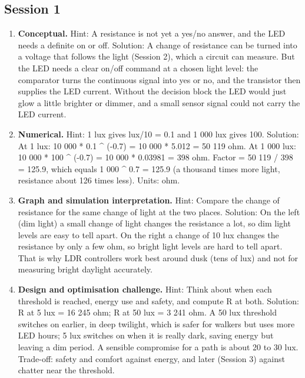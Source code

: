 \documentclass[11pt,a4paper]{article}
\begin{document}
\subsection*{Session 1}
\begin{enumerate}[nosep]
\item \textbf{Conceptual.} Hint: A resistance is not yet a yes/no answer, and the LED needs a definite on or off. Solution: A change of resistance can be turned into a voltage that follows the light (Session 2), which a circuit can measure. But the LED needs a clear on/off command at a chosen light level: the comparator turns the continuous signal into yes or no, and the transistor then supplies the LED current. Without the decision block the LED would just glow a little brighter or dimmer, and a small sensor signal could not carry the LED current.
\item \textbf{Numerical.} Hint: 1 lux gives lux/10 = 0.1 and 1 000 lux gives 100. Solution: At 1 lux: 10 000 * 0.1 \textasciicircum{} (-0.7) = 10 000 * 5.012 = 50 119 ohm. At 1 000 lux: 10 000 * 100 \textasciicircum{} (-0.7) = 10 000 * 0.03981 = 398 ohm. Factor = 50 119 / 398 = 125.9, which equals 1 000 \textasciicircum{} 0.7 = 125.9 (a thousand times more light, resistance about 126 times less). Units: ohm.
\item \textbf{Graph and simulation interpretation.} Hint: Compare the change of resistance for the same change of light at the two places. Solution: On the left (dim light) a small change of light changes the resistance a lot, so dim light levels are easy to tell apart. On the right a change of 10 lux changes the resistance by only a few ohm, so bright light levels are hard to tell apart. That is why LDR controllers work best around dusk (tens of lux) and not for measuring bright daylight accurately.
\item \textbf{Design and optimisation challenge.} Hint: Think about when each threshold is reached, energy use and safety, and compute R at both. Solution: R at 5 lux = 16 245 ohm; R at 50 lux = 3 241 ohm. A 50 lux threshold switches on earlier, in deep twilight, which is safer for walkers but uses more LED hours; 5 lux switches on when it is really dark, saving energy but leaving a dim period. A sensible compromise for a path is about 20 to 30 lux. Trade-off: safety and comfort against energy, and later (Session 3) against chatter near the threshold.
\end{enumerate}
\end{document}
